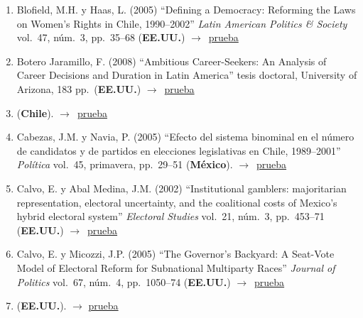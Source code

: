 \documentclass[12 pt, letter]{article}
\newenvironment{CitasMiTrabajo}{
    \begin{footnotesize}
    \begin{enumerate}[label={\footnotesize\emph{cita~\arabic*}},ref=\arabic*] %
        \setlength{\itemsep}{.1\itemsep}
        \setlength{\parskip}{.1\parskip}
    }{\end{enumerate}\end{footnotesize}}
\begin{document}
\begin{CitasMiTrabajo}
        \item Blofield, M.H. y Haas, L. (2005)
        ``Defining a Democracy: Reforming the Laws on Women's Rights in Chile, 1990--2002'' \emph{Latin American
        Politics \& Society} vol.\ 47, n\'um.\ 3, pp.\ 35--68  (\textbf{EE.UU.}) $\rightarrow$~\href{https://github.com/emagar/cv/blob/master/citasMiTrab/mrs/blofieldHaas.pdf}{prueba}

        \item Botero Jaramillo, F. (2008)
        ``Ambitious Career-Seekers: An Analysis of Career Decisions and Duration in Latin America'' tesis doctoral, University of Arizona, 183 pp.\ (\textbf{EE.UU.}) $\rightarrow$~\href{https://github.com/emagar/cv/blob/master/citasMiTrab/mrs/Botero2008.pdf}{prueba}

        \item {} (\textbf{Chile}). $\rightarrow$~\href{https://www.redalyc.org/pdf/324/32442271001.pdf}{prueba}          
          
        \item Cabezas, J.M. y Navia, P. (2005)
        ``Efecto del sistema binominal en el n\'umero de candidatos y de partidos en elecciones legislativas en Chile, 1989--2001''
        \emph{Pol\'itica} vol.\ 45, primavera, pp.\ 29--51  (\textbf{M\'exico}). $\rightarrow$~\href{https://github.com/emagar/cv/blob/master/citasMiTrab/mrs/cabezas.naviaNcandBinomial2005.pdf}{prueba}

        \item Calvo, E. y Abal Medina, J.M. (2002)
        ``Institutional
        gamblers: majoritarian representation, electoral uncertainty, and the
        coalitional costs of Mexico's hybrid electoral system''
        \emph{Electoral Studies} vol.\ 21, n\'um.\ 3, pp.\ 453--71 (\textbf{EE.UU.}) $\rightarrow$~\href{https://github.com/emagar/cv/blob/master/citasMiTrab/mrs/calvoMedina.pdf}{prueba}

        \item Calvo, E. y Micozzi, J.P. (2005)
        ``The Governor's Backyard: A
        Seat-Vote Model of Electoral Reform for Subnational Multiparty Races''
        \emph{Journal of Politics} vol.\ 67, n\'um.\ 4, pp.\ 1050--74 (\textbf{EE.UU.}) $\rightarrow$~\href{https://github.com/emagar/cv/blob/master/citasMiTrab/mrs/calvoMicozzi.pdf}{prueba}

        \item {} (\textbf{EE.UU.}). $\rightarrow$ \href{http://gvptsites.umd.edu/calvo/Calvo%20-%20Murillo-%20When_Parties_Meet_Voters_final%20revision_CPS.pdf}{prueba}
        

\end{CitasMiTrabajo}
\end{document}
